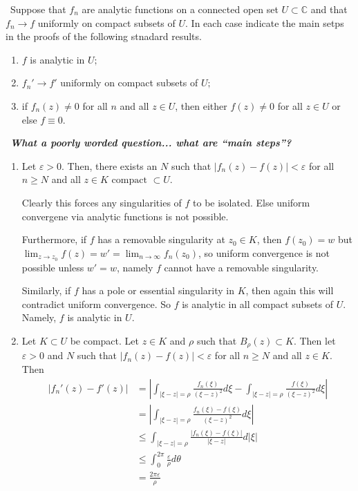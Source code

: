 \documentclass[12pt]{Homework}
\begin{document}
\begin{problem} $\,$
Suppose that $f_n$ are analytic functions on a connected open set $U\subset\mathbb{C}$ and that $f_n\to f$ uniformly on compact subsets of $U$. In each case indicate the main setps in the proofs of the following stnadard results.
\begin{enumerate}[label=(\alph*)]
    \item $f$ is analytic in $U;$
    \item $f_n'\to f'$ uniformly on compact subsets of $U;$
    \item if $f_n(z)\not=0$ for all $n$ and all $z\in U$, then either $f(z)\not=0$ for all $z\in U$ or else $f\equiv 0$.
\end{enumerate}
\end{problem}


\begin{solution}$\,$
\textit{\textbf{What a poorly worded question... what are ``main steps''?}}

\begin{enumerate}[label=(\alph*)]
    \item Let $\varepsilon>0$. Then, there exists an $N$ such that $|f_n(z)-f(z)|<\varepsilon$ for all $n\ge N$ and all $z\in K\text{ compact }\subset U$.
    
    Clearly this forces any singularities of $f$ to be isolated. Else uniform convergene via analytic functions is not possible.
    
    Furthermore, if $f$ has a removable singularity at $z_0\in K$, then $f(z_0)=w$ but $\lim_{z\to z_0}f(z)=w'=\lim_{n\to\infty}f_n(z_0)$, so uniform convergence is not possible unless $w'=w$, namely $f$ cannot have a removable singularity.
    
    Similarly, if $f$ has a pole or essential singularity in $K$, then again this will contradict uniform convergence. So $f$ is analytic in all compact subsets of $U$. Namely, $f$ is analytic in $U.$
    \item Let $K\subset U$ be compact. Let $z\in K$ and $\rho$ such that $B_\rho(z)\subset K$. Then let $\varepsilon>0$ and $N$ such that $|f_n(z)-f(z)|<\varepsilon$ for all $n\ge N$ and all $z\in K$. Then \begin{align*}
        \left|f_n'(z)-f'(z)\right|&=\left|\int_{|\xi-z|=\rho}\frac{f_n(\xi)}{(\xi-z)^2}d\xi-\int_{|\xi-z|=\rho}\frac{f(\xi)}{(\xi-z)^2}d\xi\right|\\
        &=\left|\int_{|\xi-z|=\rho}\frac{f_n(\xi)-f(\xi)}{(\xi-z)^2}d\xi\right|\\
        &\le\int_{|\xi-z|=\rho}\frac{|f_n(\xi)-f(\xi)|}{|\xi-z|}d|\xi|\\
        &\le\int_0^{2\pi}\frac{\varepsilon}{\rho}d\theta\\
        &=\frac{2\pi\varepsilon}{\rho}
    \end{align*}
    

\end{enumerate}
\end{solution}
\end{document}
